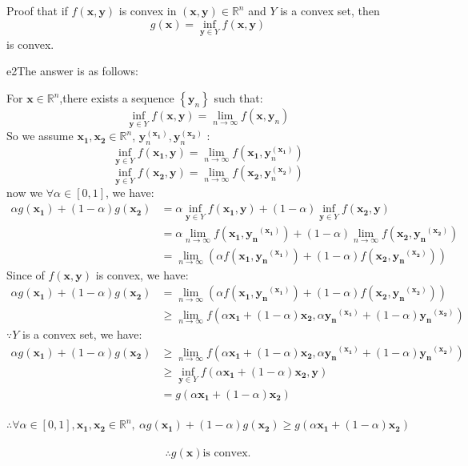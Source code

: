 \documentclass{article}
\newcommand{\xB}{\bm{x}}
\newcommand{\yB}{\bm{y}}
\newcommand{\RBB}{\mathbb{R}}
\begin{document}
\begin{excercise}\label{e2}
Proof that if $f(\xB, \yB)$ is convex in $(\xB, \yB) \in \RBB^n$ and  $Y$ is a convex set, then 
\[
g(\xB) = \inf_{\yB \in Y}f(\xB, \yB)
\]
is convex.
\end{excercise}
\begin{PROOF}{e2}The answer is as follows:

	For $\xB \in \RBB^n$,there exists a sequence $\left\{\yB_n\right\}$ such that:
	\[
		\inf_{\yB \in Y}f(\xB,\yB)=\lim_{n\rightarrow \infty}f(\xB,\yB_n)	
	\]
	So we assume $\bm{x_1},\bm{x_2} \in \RBB^n $,  $\bm{y}^{\bm{(x_1)}}_n,\bm{y}^{\bm{(x_2)}}_n$ :
	\[
		\inf_{\bm{y}\in Y}f(\bm{x_1},\bm{y})=\lim_{n\rightarrow \infty}f(\bm{x_1},\bm{y}_n^{\bm{(x_1)}})
	\]
	\[
		\inf_{\bm{y}\in Y}f(\bm{x_2},\bm{y})=\lim_{n\rightarrow \infty}f(\bm{x_2},\bm{y}_n^{\bm{(x_2)}})
	\]
	now we $\forall \alpha \in [0,1] $, we have:
	\begin{align}
		\alpha g(\bm{x_1})+(1-\alpha)g(\bm{x_2})&=\alpha \inf_{\bm{y}\in Y}f(\bm{x_1},\bm{y})+(1-\alpha)\inf_{\bm{y}\in Y}f(\bm{x_2},\bm{y})\\
		&= \alpha \lim_{n\rightarrow \infty}f(\bm{x_1},\bm{y_n}^{\bm{(x_1)}})+(1-\alpha)\lim_{n\rightarrow \infty}f(\bm{x_2},\bm{y_n}^{\bm{(x_2)}}) \\
		&= \lim_{n\rightarrow \infty}(\alpha f(\bm{x_1},\bm{y_n}^{\bm{(x_1)}})+(1-\alpha)f(\bm{x_2},\bm{y_n}^{\bm{(x_2)}}) )
	\end{align}
	Since of $f(\bm{x},\bm{y})$ is convex, we have:
	\begin{align}
		\alpha g(\bm{x_1})+(1-\alpha)g(\bm{x_2})&=\lim_{n\rightarrow \infty}(\alpha f(\bm{x_1},\bm{y_n}^{\bm{(x_1)}})+(1-\alpha)f(\bm{x_2},\bm{y_n}^{\bm{(x_2)}}) )\\
		&\ge \lim_{n\rightarrow \infty}f(\alpha \bm{x_1}+(1-\alpha)\bm{x_2},\alpha \bm{y_n}^{\bm{(x_1)}}+(1-\alpha)\bm{y_n}^{\bm{(x_2)}})
	\end{align}
	$\because Y$ is a convex set, we have:
	\begin{align}
		\alpha g(\bm{x_1})+(1-\alpha)g(\bm{x_2})&\ge \lim_{n\rightarrow \infty}f(\alpha \bm{x_1}+(1-\alpha)\bm{x_2},\alpha \bm{y_n}^{\bm{(x_1)}}+(1-\alpha)\bm{y_n}^{\bm{(x_2)}})\\
		&\ge \inf_{\bm{y}\in Y}f(\alpha \bm{x_1}+(1-\alpha)\bm{x_2},\bm{y})\\
		&=g(\alpha \bm{x_1}+(1-\alpha) \bm{x_2})
	\end{align}
	​    \[ 
	​      \therefore \forall \alpha \in [0,1],\bm{x_1},\bm{x_2} \in \RBB^n,\ 
	​      \alpha g(\bm{x_1})+(1-\alpha)g(\bm{x_2}) \ge g(\alpha \bm{x_1}+(1-\alpha) \bm{x_2})
	​    \]
	​    \[
			\therefore g(\xB) \text{is convex.}
		\]

\end{PROOF}
\end{document}
